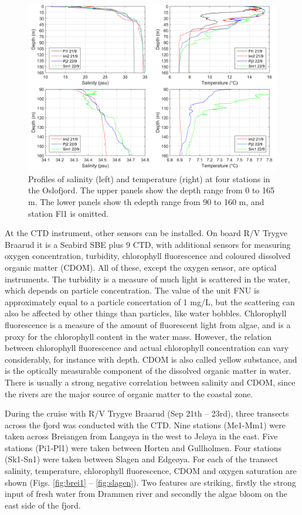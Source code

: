 \documentclass[12pt,a4paper,english]{article}
\begin{document}
\begin{figure}[ht]
\centerline{
\includegraphics*[width=\textwidth]{Figurer/Fig_profiles.png}}
\caption{\small
Profiles of salinity (left) and temperature (right) at four stations in the 
Oslofjord. The upper panels show the depth range from 0 to 165 m.
The lower panels show th edepth range from 90 to 160 m, and station Fl1 is omitted.
}
\label{fig:profiles}
\end{figure}

At the CTD instrument, other sensors can be installed. 
On board R/V Trygve Braarud it is a Seabird SBE plus 9 CTD, 
with additional sensors for measuring oxygen concentration, turbidity, 
chlorophyll fluorescence and coloured dissolved organic matter (CDOM). 
All of these, except the oxygen sensor, are optical instruments. 
The turbidity is a measure of much light is scattered in the water, 
which depends on particle concentration. The value of the unit FNU is 
approximately equal to a particle concertation of 1 mg/L, 
but the scattering can also be affected by other things than particles, 
like water bobbles. Chlorophyll fluorescence is a measure of the amount 
of fluorescent light from algae, and is a proxy for the chlorophyll content 
in the water mass. However, the relation between chlorophyll fluorescence 
and actual chlorophyll concentration can vary considerably, 
for instance with depth. 
CDOM is also called yellow substance, and is the optically measurable 
component of the dissolved organic matter in water. 
There is usually a strong negative correlation between salinity and CDOM, 
since the rivers are the major source of organic matter to the coastal zone. 

During the cruise with R/V Trygve Braarud (Sep 21th – 23rd), three transects 
across the fjord was conducted with the CTD. Nine stations (Me1-Mm1) were taken 
across Breiangen from Lang{\o}ya in the west to Jel{\o}ya in the east. 
Five stations (Pi1-Pl1) were taken between Horten and Gullholmen. 
Four stations (Sk1-Sn1) were taken between Slagen and Edge{\o}ya. 
For each of the transect salinity, temperature, chlorophyll fluorescence, 
CDOM and oxygen saturation are shown (Figs. \ref{fig:brei1} – \ref{fig:slagen}). 
Two features are striking, 
firstly the strong input of fresh water from Drammen river and secondly the algae 
bloom on the east side of the fjord.
\end{document}

